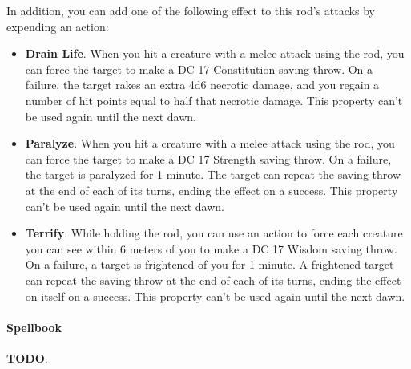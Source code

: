        In addition, you can add one of the following effect to this rod's attacks by expending an action:
        \begin{itemize}
            \item \textbf{Drain Life}.
            When you hit a creature with a melee attack using the rod, you can force the target to make a DC 17 Constitution saving throw.
            On a failure, the target rakes an extra 4d6 necrotic damage, and you regain a number of hit points equal to half that necrotic damage.
            This property can't be used again until the next dawn.
            \item \textbf{Paralyze}.
            When you hit a creature with a melee attack using the rod, you can force the target to make a DC 17 Strength saving throw.
            On a failure, the target is paralyzed for 1 minute.
            The target can repeat the saving throw at the end of each of its turns, ending the effect on a success.
            This property can't be used again until the next dawn.
            \item \textbf{Terrify}.
            While holding the rod, you can use an action to force each creature you can see within 6 meters of you to make a DC 17 Wisdom saving throw.
            On a failure, a target is frightened of you for 1 minute.
            A frightened target can repeat the saving throw at the end of each of its turns, ending the effect on itself on a success.
            This property can't be used again until the next dawn.
        \end{itemize}
    \paragraph{Spellbook} \label{item::spellbook}
        \textbf{TODO}.
